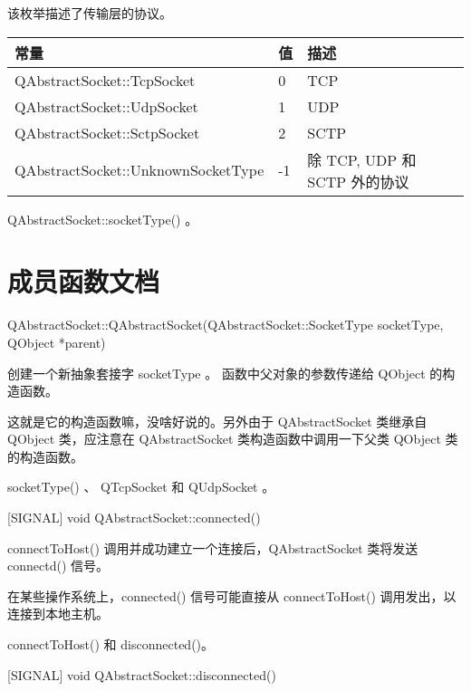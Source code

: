 该枚举描述了传输层的协议。

\begin{tabular}{|l|l|l|}
\hline
常量&	值&	描述 \\ 
\hline
QAbstractSocket::TcpSocket&	0&	TCP \\ 
\hline
QAbstractSocket::UdpSocket&	1&	UDP\\ 
\hline
QAbstractSocket::SctpSocket&	2&	SCTP\\
\hline
QAbstractSocket::UnknownSocketType&	-1&	除 TCP, UDP 和 SCTP 外的协议\\
\hline
\end{tabular}



\begin{seeAlso}
QAbstractSocket::socketType() 。
\end{seeAlso}

\splitLine


\section{成员函数文档}

QAbstractSocket::QAbstractSocket(QAbstractSocket::SocketType
socketType, QObject *parent)

创建一个新抽象套接字 socketType 。 函数中父对象的参数传递给 QObject 的构造函数。

这就是它的构造函数嘛，没啥好说的。另外由于 QAbstractSocket 类继承自 QObject 类，应注意在 QAbstractSocket 类构造函数中调用一下父类 QObject 类的构造函数。


\begin{seeAlso}
socketType() 、 QTcpSocket 和 QUdpSocket 。
\end{seeAlso}


[SIGNAL] void QAbstractSocket::connected()

connectToHost() 调用并成功建立一个连接后，QAbstractSocket 类将发送 connectd() 信号。


\begin{notice}
在某些操作系统上，connected() 信号可能直接从 connectToHost() 调用发出，以连接到本地主机。
\end{notice}


\begin{seeAlso}
connectToHost() 和 disconnected()。
\end{seeAlso}

\splitLine

[SIGNAL] void QAbstractSocket::disconnected()

